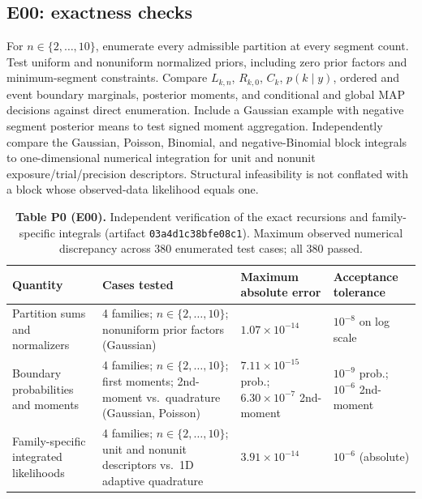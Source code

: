 \subsection{E00: exactness checks}
For $n\in\{2,\ldots,10\}$, enumerate every admissible partition at every
segment count. Test uniform and nonuniform normalized priors, including zero
prior factors and minimum-segment constraints. Compare $L_{k,n}$, $R_{k,0}$,
$C_k$, $p(k\mid y)$, ordered and event boundary marginals, posterior moments,
and conditional and global MAP decisions against direct enumeration. Include a
Gaussian example with negative segment posterior means to test signed moment
aggregation. Independently compare the Gaussian, Poisson, Binomial, and
negative-Binomial block integrals to one-dimensional numerical integration for
unit and nonunit exposure/trial/precision descriptors. Structural infeasibility
is not conflated with a block whose observed-data likelihood equals one.

\begin{table}[!htbp]
\centering\small
\caption{\textbf{Table P0 (E00).} Independent verification of the exact
recursions and family-specific integrals (artifact \texttt{03a4d1c38bfe08c1}).
Maximum observed numerical discrepancy across 380 enumerated test cases; all 380 passed.}
\label{tab:planned-oracles-paper}
\begin{tabularx}{0.88\textwidth}{@{}Y L{0.17\textwidth}L{0.17\textwidth}L{0.19\textwidth}@{}}
\toprule
Quantity & Cases tested & Maximum absolute error & Acceptance tolerance \\
\midrule
Partition sums and normalizers & 4 families; $n\in\{2,\ldots,10\}$; nonuniform prior factors (Gaussian) & $1.07\times10^{-14}$ & $10^{-8}$ on log scale \\
Boundary probabilities and moments & 4 families; $n\in\{2,\ldots,10\}$; first moments; 2nd-moment vs.\ quadrature (Gaussian, Poisson) & $7.11\times10^{-15}$ prob.; $6.30\times10^{-7}$ 2nd-moment & $10^{-9}$ prob.; $10^{-6}$ 2nd-moment \\
Family-specific integrated likelihoods & 4 families; $n\in\{2,\ldots,10\}$; unit and nonunit descriptors vs.\ 1D adaptive quadrature & $3.91\times10^{-14}$ & $10^{-6}$ (absolute) \\
\bottomrule
\end{tabularx}
\end{table}


